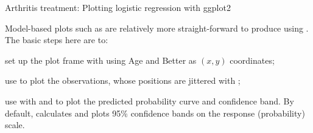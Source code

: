 \documentclass[11pt]{book}
\begin{document}
\begin{Example}[arthrit8]{Arthritis treatment: Plotting logistic regression with ggplot2}

Model-based plots such as  are relatively
more straight-forward to produce using . 
The basic steps here are to: 
\begin{itemize*}
  \item set up the plot frame with  using Age and Better as $(x, y)$ coordinates; 
  \item use  to plot the observations,
  whose positions are jittered with ;
  \item use  with  and 
  to plot the predicted probability curve and confidence band. By default,  
  calculates and plots 95\% confidence bands on the response (probability) scale.
\end{itemize*}


\end{Example}
\end{document}
